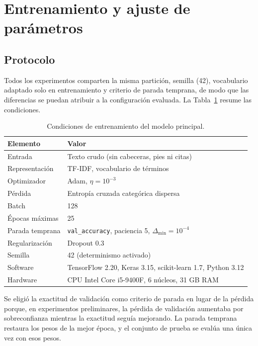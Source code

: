 \documentclass[11pt,letterpaper]{article}
\begin{document}
\section{Entrenamiento y ajuste de parámetros}\label{sec:entrenamiento}

\subsection{Protocolo}

Todos los experimentos comparten la misma partición, semilla (42), vocabulario adaptado solo en entrenamiento y criterio de parada temprana, de modo que las diferencias se puedan atribuir a la configuración evaluada. La Tabla~\ref{tab:condiciones} resume las condiciones.

\begin{table}[H]
\centering
\caption{Condiciones de entrenamiento del modelo principal.}
\label{tab:condiciones}
\begin{tabular}{ll}
\toprule
Elemento & Valor \\
\midrule
Entrada & Texto crudo (sin cabeceras, pies ni citas) \\
Representación & TF-IDF, vocabulario de \Vocab{} términos \\
Optimizador & Adam, $\eta = 10^{-3}$ \\
Pérdida & Entropía cruzada categórica dispersa \\
Batch & 128 \\
Épocas máximas & 25 \\
Parada temprana & \texttt{val\_accuracy}, paciencia 5, $\Delta_{\min}=10^{-4}$ \\
Regularización & Dropout 0.3 \\
Semilla & 42 (determinismo activado) \\
Software & TensorFlow 2.20, Keras 3.15, scikit-learn 1.7, Python 3.12 \\
Hardware & CPU Intel Core i5-9400F, 6 núcleos, 31 GB RAM \\
\bottomrule
\end{tabular}
\end{table}

Se eligió la exactitud de validación como criterio de parada en lugar de la pérdida porque, en experimentos preliminares, la pérdida de validación aumentaba por sobreconfianza mientras la exactitud seguía mejorando. La parada temprana restaura los pesos de la mejor época, y el conjunto de prueba se evalúa una única vez con esos pesos.
\end{document}
